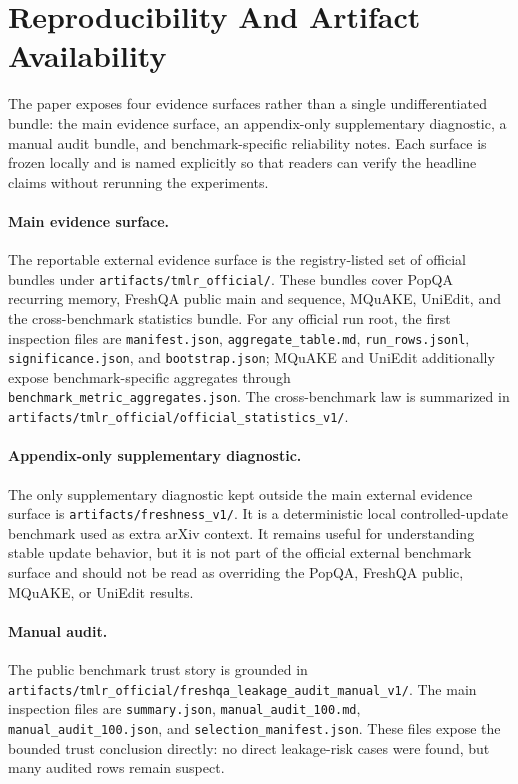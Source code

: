 \section{Reproducibility And Artifact Availability}

The paper exposes four evidence surfaces rather than a single undifferentiated bundle: the main evidence surface, an appendix-only supplementary diagnostic, a manual audit bundle, and benchmark-specific reliability notes. Each surface is frozen locally and is named explicitly so that readers can verify the headline claims without rerunning the experiments.

\paragraph{Main evidence surface.}
The reportable external evidence surface is the registry-listed set of official bundles under \texttt{artifacts/tmlr\_official/}. These bundles cover PopQA recurring memory, FreshQA public main and sequence, MQuAKE, UniEdit, and the cross-benchmark statistics bundle. For any official run root, the first inspection files are \texttt{manifest.json}, \texttt{aggregate\_table.md}, \texttt{run\_rows.jsonl}, \texttt{significance.json}, and \texttt{bootstrap.json}; MQuAKE and UniEdit additionally expose benchmark-specific aggregates through \texttt{benchmark\_metric\_aggregates.json}. The cross-benchmark law is summarized in \texttt{artifacts/tmlr\_official/official\_statistics\_v1/}.

\paragraph{Appendix-only supplementary diagnostic.}
The only supplementary diagnostic kept outside the main external evidence surface is \texttt{artifacts/freshness\_v1/}. It is a deterministic local controlled-update benchmark used as extra arXiv context. It remains useful for understanding stable update behavior, but it is not part of the official external benchmark surface and should not be read as overriding the PopQA, FreshQA public, MQuAKE, or UniEdit results.

\paragraph{Manual audit.}
The public benchmark trust story is grounded in \texttt{artifacts/tmlr\_official/freshqa\_leakage\_audit\_manual\_v1/}. The main inspection files are \texttt{summary.json}, \texttt{manual\_audit\_100.md}, \texttt{manual\_audit\_100.json}, and \texttt{selection\_manifest.json}. These files expose the bounded trust conclusion directly: no direct leakage-risk cases were found, but many audited rows remain suspect.

